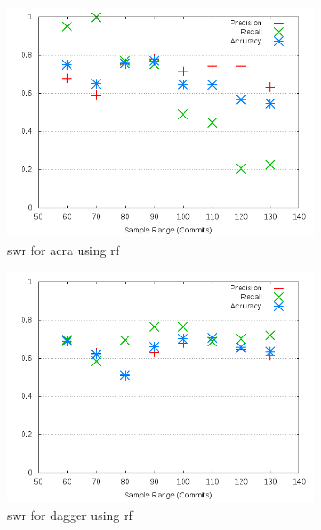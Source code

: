 

\begin{figure}[h]
    \centering
        \includegraphics[width=0.8\textwidth]{images/rf/test_1/acra_sample_range}
        \caption{\gls{swr} for acra using \gls{rf}}
        \label{fig:test_1_acra_rf}
\end{figure}

\begin{figure}[h]
    \centering
        \includegraphics[width=0.8\textwidth]{images/rf/test_1/dagger_sample_range}
        \caption{\gls{swr} for dagger using \gls{rf}}
        \label{fig:test_1_dagger_rf}
\end{figure}


